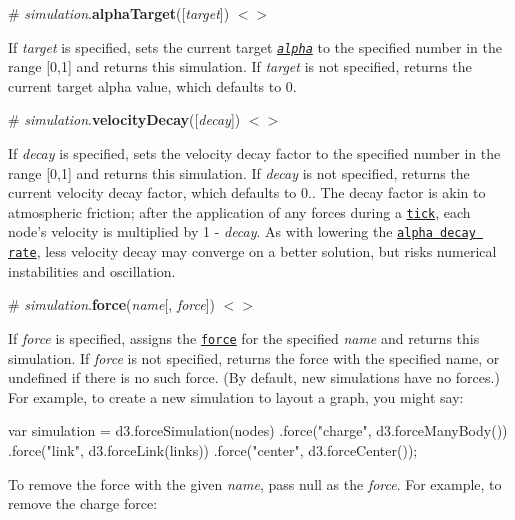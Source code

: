 \label{_simulation_alphaTarget}%
\# {\itshape simulation}.{\bfseries alpha\+Target}(\mbox{[}{\itshape target}\mbox{]}) \href{https://github.com/d3/d3-force/blob/master/src/simulation.js#L104}{\tt $<$$>$}

If {\itshape target} is specified, sets the current target \href{#simulation_alpha}{\tt {\itshape alpha}} to the specified number in the range \mbox{[}0,1\mbox{]} and returns this simulation. If {\itshape target} is not specified, returns the current target alpha value, which defaults to 0.

\label{_simulation_velocityDecay}%
\# {\itshape simulation}.{\bfseries velocity\+Decay}(\mbox{[}{\itshape decay}\mbox{]}) \href{https://github.com/d3/d3-force/blob/master/src/simulation.js#L108}{\tt $<$$>$}

If {\itshape decay} is specified, sets the velocity decay factor to the specified number in the range \mbox{[}0,1\mbox{]} and returns this simulation. If {\itshape decay} is not specified, returns the current velocity decay factor, which defaults to 0.. The decay factor is akin to atmospheric friction; after the application of any forces during a \href{#simulation_tick}{\tt tick}, each node’s velocity is multiplied by 1 -\/ {\itshape decay}. As with lowering the \href{#simulation_alphaDecay}{\tt alpha decay rate}, less velocity decay may converge on a better solution, but risks numerical instabilities and oscillation.

\label{_simulation_force}%
\# {\itshape simulation}.{\bfseries force}({\itshape name}\mbox{[}, {\itshape force}\mbox{]}) \href{https://github.com/d3/d3-force/blob/master/src/simulation.js#L112}{\tt $<$$>$}

If {\itshape force} is specified, assigns the \href{#forces}{\tt force} for the specified {\itshape name} and returns this simulation. If {\itshape force} is not specified, returns the force with the specified name, or undefined if there is no such force. (By default, new simulations have no forces.) For example, to create a new simulation to layout a graph, you might say\+:


\begin{DoxyCode}
var simulation = d3.forceSimulation(nodes)
    .force("charge", d3.forceManyBody())
    .force("link", d3.forceLink(links))
    .force("center", d3.forceCenter());
\end{DoxyCode}


To remove the force with the given {\itshape name}, pass null as the {\itshape force}. For example, to remove the charge force\+:


